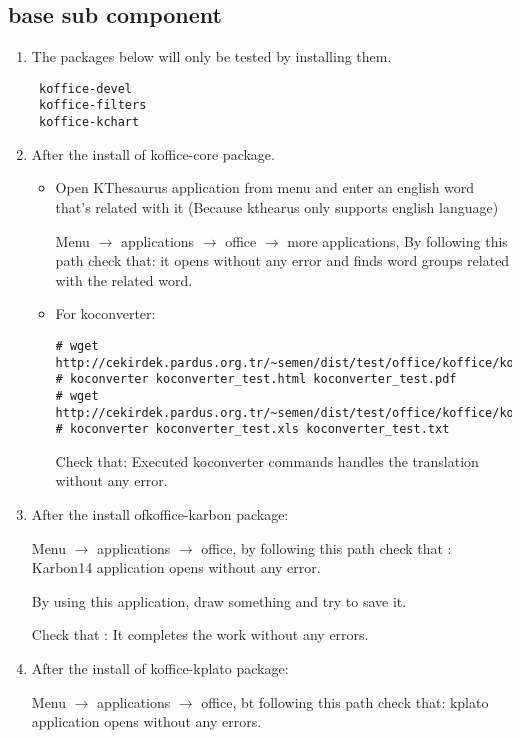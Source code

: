 \documentclass[a4paper,10pt]{article}
\begin{document}
\subsection*{base sub component}
\begin{enumerate}
\item The packages below will only be tested by installing them.

\begin{verbatim}
 koffice-devel 
 koffice-filters
 koffice-kchart
\end{verbatim}
\item After the install of koffice-core package.

\begin{itemize}
\item Open KThesaurus application from menu and enter an english word that's related with it (Because kthearus only supports english language)

Menu $\rightarrow$ applications $\rightarrow$ office $\rightarrow$ more applications, By following this path check that: it opens without any error and finds word groups related with the related word.

\item For koconverter:
\begin{verbatim}
# wget http://cekirdek.pardus.org.tr/~semen/dist/test/office/koffice/koconverter_test.html
# koconverter koconverter_test.html koconverter_test.pdf
# wget http://cekirdek.pardus.org.tr/~semen/dist/test/office/koffice/koconverter_test.xls
# koconverter koconverter_test.xls koconverter_test.txt
\end{verbatim}

Check that: Executed koconverter commands handles the translation without any error.
\end{itemize}
\item After the install ofkoffice-karbon package:

Menu $\rightarrow$ applications $\rightarrow$ office, by following this path check that :  Karbon14 application opens without any error.

By using this application, draw  something and try to save it.

Check that : It completes the work without any errors.

\item After the install of koffice-kplato package:

Menu $\rightarrow$ applications $\rightarrow$ office, bt following this path check that: kplato application opens without any errors.


\end{enumerate}
\end{document}
